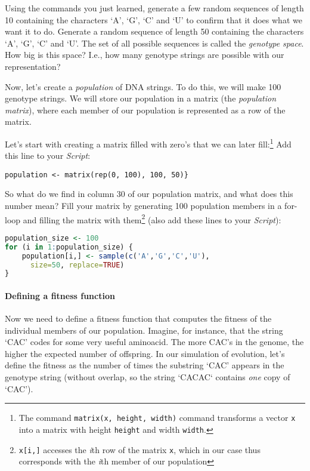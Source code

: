 \documentclass[a4paper, 9pt]{article}
\begin{document}
\begin{exercise}
    \action Using the commands you just learned, generate a few random sequences of length 10 containing the characters `A', `G', `C' and `U' to confirm that it does what we want it to do.
    \action Generate a random sequence of length 50 containing the characters `A', `G', `C' and `U'. 
    \askstar The set of all possible sequences is called the \textit{genotype space}. How big is this space? I.e., how many genotype strings are possible with our representation?
\end{exercise}

Now, let's create a \textit{population} of DNA strings. To do this, we
will make 100 genotype strings.
We will store our population in a matrix (the \textit{population matrix}), where each member of our population is represented as a row of the matrix. 

\begin{exercise}
\action Let's start with creating a matrix filled with zero's that we can later fill:\footnote{The command \texttt{matrix(x, height, width)} command transforms a vector \texttt{x} into a matrix with height \texttt{height} and width \texttt{width}.} Add this line to your \emph{Script}:
  \begin{lstlisting}
population <- matrix(rep(0, 100), 100, 50)}
\end{lstlisting}
  So what do we find in column 30 of our population matrix, and what does this number mean?
  \action Fill your matrix by generating 100 population members in a for-loop and filling the matrix with them\footnote{\texttt{x[i,]} accesses the \textit{i}th row of the matrix \texttt{x}, which in our case thus corresponds with the \textit{i}th member of our population} (also add these lines to your \emph{Script}):
  \begin{lstlisting}[language=R]
population_size <- 100
for (i in 1:population_size) {
    population[i,] <- sample(c('A','G','C','U'), 
      size=50, replace=TRUE)
}
    \end{lstlisting}
\end{exercise}


\paragraph{Defining a fitness function}
Now we need to define a fitness function that computes the fitness of
the individual members of our population. Imagine, for instance, that
the string `CAC' codes for some very useful aminoacid. The more CAC's in
the genome, the higher the expected number of offspring. In our
simulation of evolution, let's define the fitness as the number of times
the substring `CAC' appears in the genotype string (without overlap, so the string `CACAC` contains \emph{one} copy of `CAC').
\end{document}
